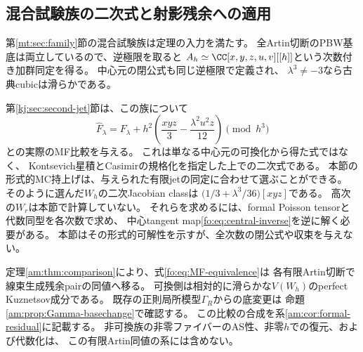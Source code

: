 \subsection{混合試験族の二次式と射影残余への適用}

第\ref{mt:sec:family}節の混合試験族は定理の入力を満たす。
全Artin切断のPBW基底は両立しているので、逆極限を取ると
$A_h\simeq\CC[x,y,z,u,v][[h]]$という次数付き加群同定を得る。
中心元の閉公式も同じ逆極限で定義され、
$\lambda^3\ne-3$なら古典cubicは滑らかである。

第\ref{kj:sec:second-jet}節は、この族について
\[
 \widehat F_\lambda
 =F_\lambda+
 h^2\left(\frac{xyz}{3}-\frac{\lambda^2u^2z}{12}\right)
 \pmod{h^3}
\]
との実際のMF比較を与える。
これは単なる中心元の可換化から得た式ではなく、
Kontsevich星積とCasimirの規格化を指定した上での二次式である。
本節の形式的MC持上げは、与えられた有限jetの同定に合わせて選ぶことができる。
そのように選んだ$W_h$の二次Jacobian classは
$\bigl(1/3+\lambda^3/36\bigr)[xyz]$である。
高次の$W_r$は本節で計算していない。
それらを求めるには、formal Poisson tensorと代数同型を各次数で求め、
中心tangent map\eqref{fo:eq:central-inverse}を逆に解く必要がある。
本節はその形式的可解性を示すが、全次数の閉公式や収束を与えない。

定理\ref{am:thm:comparison}により、式\eqref{fo:eq:MF-equivalence}は
各有限Artin切断で線束生成残余pairの同値へ移る。
可換側は相対的に滑らかな$V(W_h)$のperfect Kuznetsov成分である。
既存の正則局所模型$\Gamma_R$からの底変更は
命題\ref{am:prop:Gamma-basechange}で確認する。
この比較の合成を系\ref{am:cor:formal-residual}に記載する。
非可換族の非零ファイバーのAS性、非零$h$での復元、および代数化は、
この有限Artin同値の系には含めない。
